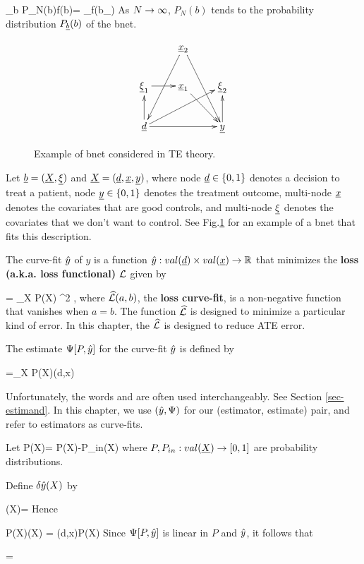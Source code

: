 \beq
\sum_b P_N(b)f(b)=
\sum_\s f(b_\s)
\eeq
As $N\rightarrow \infty$, $P_N(b)$ tends
to the probability distribution $P_\rvb(b)$
of the bnet.
\begin{figure}[h!]
$$
\xymatrix{
&\rvx_2\ar[ddl]\ar[ddr]
\\
\ul{\xi}_1\ar[r]
&\rvx_1\ar[dr]
&\ul{\xi}_2
\\
\rvd\ar[rr]\ar[u]\ar[rru]
&
&\rvy\ar[u]
}
$$
\caption{Example of bnet considered in TE
theory.}
\label{fig-targeted-bnet}
\end{figure}

Let $\rvb=(\rvX, \ul{\xi})$ and
$\rvX=(\rvd, \rvx,\rvy)$,
where
node $\rvd\in\bool$ denotes a decision to treat a patient,
node $\rvy\in \bool$ denotes the treatment outcome,
multi-node $\rvx$ denotes the covariates
that are good controls, and multi-node $\ul{\xi}$ denotes
the covariates that we don't want to control.
See Fig.\ref{fig-targeted-bnet}
for an example of a bnet that fits this description.


The curve-fit ${\hat{y}}$ of $y$
is a function $\haty:val(\rvd)\times val(\rvx)\rarrow \RR$
that minimizes the {\bf loss (a.k.a. loss functional)} ${\cal L}$
given by


\beq
\call[P, \haty]= \sum_X P(X) \hatl[y, \haty(d,x)]^2
\;,
\eeq
where ${\widehat{{\cal L}}}(a,b)$, the {\bf loss
curve-fit}, is a
non-negative function
that vanishes when $a=b$.
The function ${\widehat{{\cal L}}}$ is designed
to minimize a particular kind of error.
In this chapter, the ${\widehat{{\cal L}}}$
is designed to reduce ATE error.


The estimate
 $\Psi[P, {\hat{y}}]$ for the curve-fit ${\hat{y}}$
is defined by

\beq
\Psi[P, \haty] =\sum_X P(X)\haty(d,x)
\eeq

Unfortunately, the words 
and  are often used
interchangeably. See Section
\ref{sec-estimand}.
In this chapter, we use $({\hat{y}}, \Psi)$
for our (estimator, estimate) pair,
and refer to estimators as curve-fits.


Let
\beq
\delta P(X)=
P(X)-P_{in}(X)
\eeq
where $P, P_{in}:val(\rvX)\rarrow [0,1]$ are
probability distributions.

Define $\delta{\hat{y}}(X)$ by

\beq
\delta\haty(X)= 
\eeq
Hence

\beq
P(X)\delta\haty(X) = \haty(d,x)\delta P(X)
\eeq
Since $\Psi[P, {\hat{y}}]$
is linear in $P$ and ${\hat{y}}$,
it follows that

\beq
{}=
\eeq


